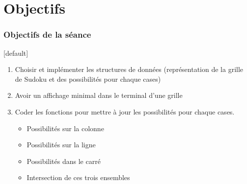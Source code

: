 \documentclass{beamer}
\begin{document}
	\section{Objectifs}
	\begin{frame}
	\frametitle{Objectifs de la séance}
	[default]
	\begin{enumerate}
		\item Choisir et implémenter les structures de données (représentation de la grille de Sudoku et des possibilités pour chaque cases)
		\item Avoir un affichage minimal dans le terminal d'une grille
		\item Coder les fonctions pour mettre à jour les possibilités pour chaque cases.
		\begin{itemize}
			\item Possibilités sur la colonne
			\item Possibilités sur la ligne
			\item Possibilités dans le carré
			\item Intersection de ces trois ensembles
		\end{itemize}
	\end{enumerate}
\end{frame}
\end{document}
